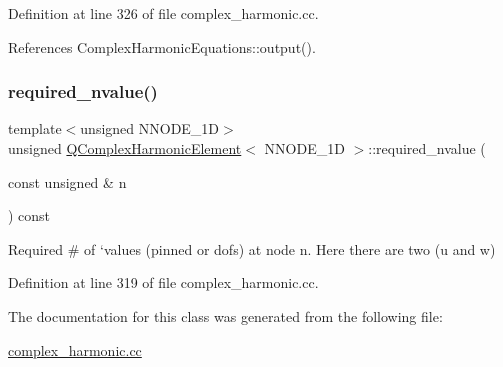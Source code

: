 Definition at line 326 of file complex\+\_\+harmonic.\+cc.



References Complex\+Harmonic\+Equations\+::output().

\mbox{\label{classQComplexHarmonicElement_a3f1d68324e9d8b9e143044d716c72a87}} 
\subsubsection{\texorpdfstring{required\+\_\+nvalue()}{required\_nvalue()}}
{\footnotesize\ttfamily template$<$unsigned N\+N\+O\+D\+E\+\_\+1D$>$ \\
unsigned \hyperlink{classQComplexHarmonicElement}{Q\+Complex\+Harmonic\+Element}$<$ N\+N\+O\+D\+E\+\_\+1D $>$\+::required\+\_\+nvalue (\begin{DoxyParamCaption}\item[{const unsigned \&}]{n }\end{DoxyParamCaption}) const\hspace{0.3cm}{\ttfamily [inline]}}



Required \# of `values\textquotesingle{} (pinned or dofs) at node n. Here there are two (u and w) 



Definition at line 319 of file complex\+\_\+harmonic.\+cc.



The documentation for this class was generated from the following file\+:\begin{DoxyCompactItemize}
\item 
\hyperlink{complex__harmonic_8cc}{complex\+\_\+harmonic.\+cc}\end{DoxyCompactItemize}
